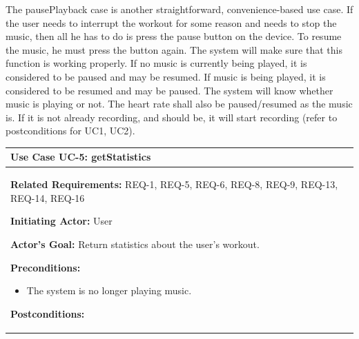 \documentclass[letterpaper,english, 12pt]{scrreprt}
\begin{document}
The pausePlayback case is another straightforward, convenience-based use case. If the user needs to interrupt the workout for some reason and needs to stop the music, then all he has to do is press the pause button on the device. To resume the music, he must press the button again.
The system will make sure that this function is working properly. If no music is currently being played, it is considered to be paused and may be resumed. If music is being played, it is considered to be resumed and may be paused. The system will know whether music is playing or not. The heart rate shall also be paused/resumed as the music is. If it is not already recording, and should be, it will start recording (refer to postconditions for UC1, UC2).

\begin{center}
        \begin{tabular}{|C{15cm}|}
                \hline
                        \textbf{Use Case UC-5: getStatistics}\\
                \hline
                        \begin{flushleft}
                                \textbf{Related Requirements: } REQ-1, REQ-5, REQ-6, REQ-8, REQ-9, REQ-13, REQ-14, REQ-16
                        \end{flushleft}
                        \begin{flushleft}
                                \textbf{Initiating Actor: } User
                        \end{flushleft}
                        \begin{flushleft}
                                \textbf{Actor's Goal: } Return statistics about the user's workout.
                        \end{flushleft}
                        \begin{flushleft}
                                \textbf{Preconditions: }
                        \end{flushleft}
                                \begin{itemize}
                                        \item The system is no longer playing music.
                                \end{itemize}
                        \begin{flushleft}
                                \textbf{Postconditions: }
                        \end{flushleft}
                                \begin{itemize}

\end{itemize}
\end{tabular}
\end{center}
\end{document}
